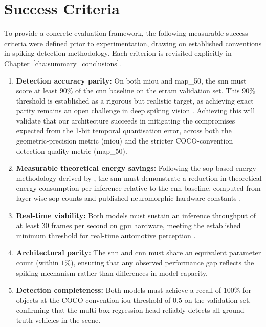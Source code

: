 \section{Success Criteria}
\label{sec:intro_success_criteria}

To provide a concrete evaluation framework, the following measurable success criteria were defined prior to experimentation, drawing on established conventions in spiking-detection methodology. Each criterion is revisited explicitly in Chapter~\ref{cha:summary_conclusions}.

\begin{enumerate}
    \item \textbf{Detection accuracy parity:}
    On both \gls{miou} and \gls{map_50}, the \gls{snn} must score at least $90\%$ of the \gls{cnn} baseline on the \gls{etram} validation set.
    This $90\%$ threshold is established as a rigorous but realistic target, as achieving exact parity remains an open challenge in deep spiking vision \cite{iaboni2024review}.
    Achieving this will validate that our architecture succeeds in mitigating the compromises expected from the 1-bit temporal quantisation error, across both the geometric-precision metric (\gls{miou}) and the stricter COCO-convention detection-quality metric (\gls{map_50}).

    \item \textbf{Measurable theoretical energy savings:}
    Following the \gls{sop}-based energy methodology derived by \textcite{lemaire2022analytical},
    the \gls{snn} must demonstrate a reduction in theoretical energy consumption per inference relative to the \gls{cnn} baseline, computed from layer-wise \gls{sop} counts and published neuromorphic hardware constants \cite{horowitz20141}.

    \item \textbf{Real-time viability:} 
    Both models must sustain an inference throughput of at least $30$ frames per second on \gls{gpu} hardware, meeting the established minimum threshold for real-time automotive perception \cite{khan2024real}.

    \item \textbf{Architectural parity:} 
    The \gls{snn} and \gls{cnn} must share an equivalent parameter count (within $1\%$), ensuring that any observed performance gap reflects the spiking mechanism rather than differences in model capacity.

    \item \textbf{Detection completeness:}
    Both models must achieve a recall of $100\%$ for objects at the COCO-convention \gls{iou} threshold of $0.5$ \cite{lin2014microsoft} on the validation set, confirming that the multi-box regression head reliably detects all ground-truth vehicles in the scene.


\end{enumerate}
